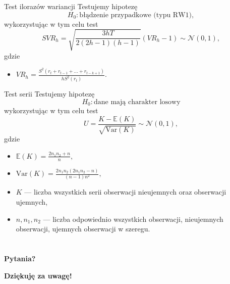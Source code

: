 \documentclass[a4paper, 11pt]{beamer}
\begin{document}
	\begin{frame}{Test ilorazów wariancji}
		Testujemy hipotezę \[
				H_{0}: \mbox{błądzenie przypadkowe (typu RW1)},
		\] wykorzystując w tym celu test \[
			SVR_h = \sqrt{\frac{3hT}{2\left(2h-1\right)\left(h-1\right)}} \left(VR_h - 1\right) \sim \mathcal{N}\left(0,1\right),
		\] gdzie
		\begin{itemize}
			\item $VR_h = \frac{S^2\left(r_t+r_{t-1}+\ldots+r_{t-k+1}\right)}{hS^2\left(r_t\right)}.$
		\end{itemize}
	\end{frame}
	
	\begin{frame}{Test serii}
		Testujemy hipotezę \[
				H_{0}: \mbox{dane mają charakter losowy}
		\] wykorzystując w tym celu test \[
			U=\frac{K-\mathbb{E}\left(K\right)}{\sqrt{\mbox{Var}\left(K\right)}} \sim \mathcal{N}\left(0,1\right),
		\] gdzie
		\begin{itemize}
			\item $\mathbb{E}\left(K\right) = \frac{2 n_1 n_2 + n}{n},$
			\item $\mbox{Var}\left(K\right) = \frac{2 n_1 n_2 \left(2 n_1 n_2 - n\right)}{\left(n - 1\right) n^2},$
			\item $K$ --- liczba wszystkich serii obserwacji nieujemnych oraz obserwacji ujemnych,
			\item $n, n_1, n_2$ --- liczba odpowiednio wszystkich obserwacji, nieujemnych obserwacji, ujemnych obserwacji w szeregu.
		\end{itemize}
	\end{frame}
	
	\section*{}
	
	\begin{frame}
		\center
		\Huge \bfseries
		Pytania?
	\end{frame}

	\begin{frame}
		\center
		\Huge \bfseries
		Dziękuję za uwagę!
	\end{frame}
\end{document}
